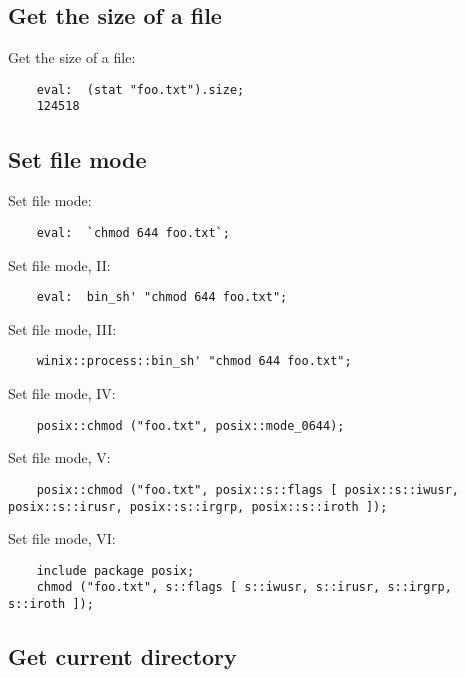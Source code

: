 \subsection{Get the size of a file}

Get the size of a file:
\begin{verbatim}
    eval:  (stat "foo.txt").size;
    124518
\end{verbatim}

\cutend*

\subsection{Set file mode}

Set file mode:
\begin{verbatim}
    eval:  `chmod 644 foo.txt`;
\end{verbatim}

Set file mode, II:
\begin{verbatim}
    eval:  bin_sh' "chmod 644 foo.txt";
\end{verbatim}

Set file mode, III:
\begin{verbatim}
    winix::process::bin_sh' "chmod 644 foo.txt";
\end{verbatim}

Set file mode, IV:
\begin{verbatim}
    posix::chmod ("foo.txt", posix::mode_0644);
\end{verbatim}

Set file mode, V:
\begin{verbatim}
    posix::chmod ("foo.txt", posix::s::flags [ posix::s::iwusr, posix::s::irusr, posix::s::irgrp, posix::s::iroth ]);
\end{verbatim}

Set file mode, VI:
\begin{verbatim}
    include package posix;
    chmod ("foo.txt", s::flags [ s::iwusr, s::irusr, s::irgrp, s::iroth ]);
\end{verbatim}

\cutend*

\subsection{Get current directory}

